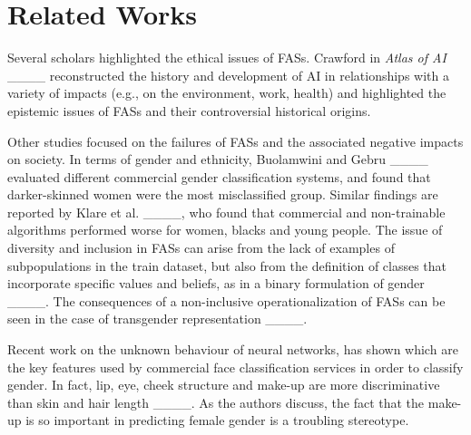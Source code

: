 \section{Related Works}
\label{sec:rel_work}
Several scholars highlighted the ethical issues of FASs.
Crawford in \textit{Atlas of AI} ____ reconstructed the history and development of AI in relationships with a variety of impacts (e.g., on the environment, work, health) and highlighted the epistemic issues of FASs and their controversial historical origins.

Other studies focused on the failures of FASs and the associated negative impacts on society. 
In terms of gender and ethnicity, Buolamwini and Gebru ____ evaluated different commercial gender classification systems, and found that darker-skinned women were the most misclassified group.
Similar findings are reported by Klare
et al. ____, who found that commercial and non-trainable algorithms performed worse for women, blacks and young people.
The issue of diversity and inclusion in FASs can arise from the lack of examples of subpopulations in the train dataset, but also from the definition of classes that incorporate specific values and beliefs, as in a binary formulation of gender ____.
The consequences of a non-inclusive operationalization of FASs can be seen in the case of transgender representation ____.

Recent work on the unknown behaviour of neural networks, has shown which are the key features used by commercial face classification services in order to classify gender. 
In fact, lip, eye, cheek structure and make-up are more discriminative than skin and hair length ____.
As the authors discuss, the fact that the make-up is so important in predicting female gender is a troubling stereotype.


